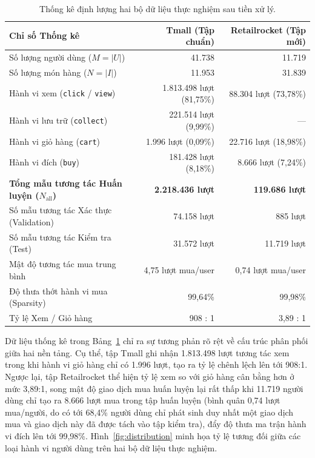 \documentclass{llncs}
\begin{document}
\begin{table}[H]
\caption{Thống kê định lượng hai bộ dữ liệu thực nghiệm sau tiền xử lý.}
\label{tab:data}
\centering
\begin{tabular}{lrr}
\toprule
\textbf{Chỉ số Thống kê} & \textbf{Tmall (Tập chuẩn)} & \textbf{Retailrocket (Tập mới)} \\
\midrule
Số lượng người dùng ($M = |U|$) & 41.738 & 11.719 \\
Số lượng món hàng ($N = |I|$) & 11.953 & 31.839 \\
Hành vi xem (\texttt{click} / \texttt{view}) & 1.813.498 lượt (81{,}75\%) & 88.304 lượt (73{,}78\%) \\
Hành vi lưu trữ (\texttt{collect}) & 221.514 lượt (9{,}99\%) & --- \\
Hành vi giỏ hàng (\texttt{cart}) & 1.996 lượt (0{,}09\%) & 22.716 lượt (18{,}98\%) \\
Hành vi đích (\texttt{buy}) & 181.428 lượt (8{,}18\%) & 8.666 lượt (7{,}24\%) \\
\midrule
\textbf{Tổng mẫu tương tác Huấn luyện ($N_{\mathrm{all}}$)} & \textbf{2.218.436 lượt} & \textbf{119.686 lượt} \\
Số mẫu tương tác Xác thực (Validation) & 74.158 lượt & 885 lượt \\
Số mẫu tương tác Kiểm tra (Test) & 31.572 lượt & 11.719 lượt \\
\midrule
Mật độ tương tác mua trung bình & 4{,}75 lượt mua/user & 0{,}74 lượt mua/user \\
Độ thưa thớt hành vi mua (Sparsity) & 99{,}64\% & 99{,}98\% \\
Tỷ lệ Xem / Giỏ hàng & 908 : 1 & 3{,}89 : 1 \\
\bottomrule
\end{tabular}
\end{table}

Dữ liệu thống kê trong Bảng~\ref{tab:data} chỉ ra sự tương phản rõ rệt về cấu trúc phân phối giữa hai nền tảng. Cụ thể, tập Tmall ghi nhận 1.813.498 lượt tương tác xem trong khi hành vi giỏ hàng chỉ có 1.996 lượt, tạo ra tỷ lệ chênh lệch lên tới 908:1. Ngược lại, tập Retailrocket thể hiện tỷ lệ xem so với giỏ hàng cân bằng hơn ở mức 3{,}89:1, song mật độ giao dịch mua huấn luyện lại rất thấp khi 11.719 người dùng chỉ tạo ra 8.666 lượt mua trong tập huấn luyện (bình quân 0{,}74 lượt mua/người, do có tới 68{,}4\% người dùng chỉ phát sinh duy nhất một giao dịch mua và giao dịch này đã được tách vào tập kiểm tra), đẩy độ thưa ma trận hành vi đích lên tới 99{,}98\%. Hình~\ref{fig:distribution} minh họa tỷ lệ tương đối giữa các loại hành vi người dùng trên hai bộ dữ liệu thực nghiệm.
\end{document}
